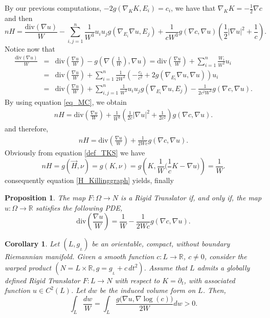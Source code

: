 \documentclass[12pt]{article}
\newtheorem{proposition}[lemma]{Proposition}
\newtheorem{corollary}[lemma]{Corollary}
\numberwithin{lemma}{section}
\begin{document}
By our previous computations, $-2g\left(\nabla_{K} K, E_i\right)=c_i$, we have that $\nabla_{K} K=-\frac{1}{2}\nabla c$ and then 
\begin{equation} \label{eq_MC}
nH=\frac{\mathrm{div}(\nabla u)}{W} -\sum^{n}_{i,j=1}\frac{1}{W^3}u_iu_jg(\nabla_{E_i}\nabla u,E_j)+\frac{1}{c W^3}g(\nabla c,\nabla u)\left(\frac{1}{2}|\nabla u|^2+\frac{1}{c}\right).
\end{equation}
Notice now that 
\begin{eqnarray*}
\frac{\mathrm{div}(\nabla u)}{W}&=&
\mathrm{div}\left(\frac{\nabla u}{W}\right) -g\left(\nabla\left(\frac{1}{W}\right),\nabla u\right) =\mathrm{div}\left(\frac{\nabla u}{W}\right)+\sum_{i=1}^n\frac{W_i}{W^2}u_i\\
&=&\mathrm{div}\left(\frac{\nabla u}{W}\right) 
+\sum_{i=1}^n  \frac{1}{2W^3}\left( -\frac{c_i}{c^2}+2g(\nabla_{E_i}\nabla u,\nabla u)\right)u_i\\
&=&\mathrm{div}\left(\frac{\nabla u}{W}\right) +\sum_{i,j=1}^n\frac{1}{W^3}u_iu_jg(\nabla_{E_i}\nabla u,E_j)-\frac{1}{2c^2W^3}g(\nabla c,\nabla u).
\end{eqnarray*}
By using equation \eqref{eq_MC}, we obtain 
\begin{eqnarray*}
nH=\mathrm{div}\left(\frac{\nabla u}{W}\right)+\frac{1}{W^3}\left(\frac{1}{2c}|\nabla u|^2+\frac{1}{2c^2}\right)g(\nabla c,\nabla u).
\end{eqnarray*}
and therefore, 
\begin{eqnarray}\label{H_Killinggraph}
nH=\mathrm{div}\left(\frac{\nabla u}{W}\right)+\frac{1}{2Wc}g(\nabla c,\nabla u).
\end{eqnarray}
Obviously from equation \eqref{def_TKS} we have 
\[nH=g(\vec{H},\nu)=g(K,\nu)=g\left(K,\frac{1}{W}\Big(\frac{1}{c}K-\nabla u\Big)\right)=\frac{1}{W}.\]
consequently equation \eqref{H_Killinggraph} yields, finally
\begin{proposition} \label{EDPproposition}
The map $F:\Omega\rightarrow N$ is a Rigid Translator if, and only if, the map $u:\Omega\rightarrow\mathbb{R}$ satisfies the following PDE,
\begin{equation}\label{EDP}
\mathrm{div}\left(\frac{\nabla u}{W}\right)=\frac{1}{W}-\frac{1}{2Wc}g(\nabla c,\nabla u).
\end{equation}
\end{proposition}
\begin{corollary} Let $(L,g_{_L})$ be an orientable, compact,  without boundary Riemannian manifold. Given a smooth function $c:L\rightarrow\mathbb{R}$, $c\neq 0$, consider the warped product $(N=L\times\mathbb{R},g=g_{_L}+c\,dt^2)$. Assume that $L$ admits a globally defined Rigid Translator $F:L\rightarrow N$ with respect to $K=\partial_t$, with associated function $u\in C^2(L)$. Let $dw$ be the induced volume form on $L$. Then,
\[ \int_L \frac{dw}{W}=
\int_L \frac{g\big(\nabla u,\nabla \log(c)\big)}{2W}dw>0.
\]
\end{corollary}
\end{document}
